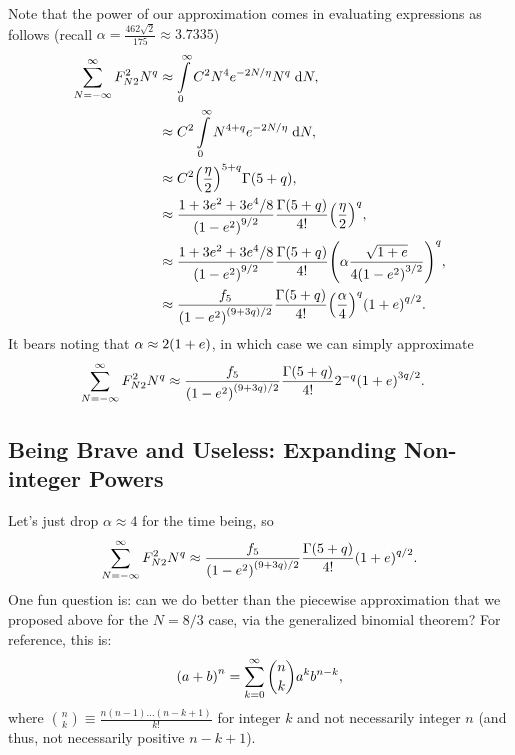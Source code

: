 \documentclass[11pt,
        usenames, %
        dvipsnames %
    ]{article}
\DeclarePairedDelimiter\p{\lparen}{\rparen}
\begin{document}
Note that the power of our approximation comes in evaluating expressions as
follows (recall $\alpha = \frac{462\sqrt{2}}{175} \approx 3.7335$)
\begin{align}
    \sum\limits_{N = -\infty}^\infty F_{N2}^2 N^q
        &\approx \int\limits_0^\infty C^2 N^4 e^{-2 N / \eta}N^q
            \;\mathrm{d}N,\\
        &\approx C^2 \int\limits_{0}^\infty N^{4 + q}
            e^{-2N / \eta}\;\mathrm{d}N,\\
        &\approx C^2 \p*{\frac{\eta}{2}}^{5 + q}\Gamma\p*{5 + q},\\
        &\approx \frac{1 + 3e^2 + 3e^4/8}{\p*{1 - e^2}^{9/2}}
            \frac{\Gamma\p*{5 + q}}{4!}\p*{\frac{\eta}{2}}^q,\\
        &\approx \frac{1 + 3e^2 + 3e^4/8}{\p*{1 - e^2}^{9/2}}
            \frac{\Gamma\p*{5 + q}}{4!}\p*{\alpha\frac{\sqrt{1 + e}}{
                4\p*{1 - e^2}^{3/2}}}^q,\\
        &\approx \frac{f_5}{\p*{1 - e^2}^{(9 + 3q) / 2}}
            \frac{\Gamma\p*{5 + q}}{4!}\p*{\frac{\alpha}{4}}^q
            \p*{1 + e}^{q/2}.
\end{align}
It bears noting that $\alpha \approx 2\p*{1 + e}$, in which case we can simply
approximate
\begin{align}
    \sum\limits_{N = -\infty}^\infty F_{N2}^2 N^q
        &\approx \frac{f_5}{\p*{1 - e^2}^{(9 + 3q) / 2}}
            \frac{\Gamma\p*{5 + q}}{4!}2^{-q}
            \p*{1 + e}^{3q/2}.
\end{align}

\subsection{Being Brave and Useless: Expanding Non-integer Powers}

Let's just drop $\alpha \approx 4$ for the time being, so
\begin{equation}
    \sum\limits_{N = -\infty}^\infty F_{N2}^2 N^q
        \approx \frac{f_5}{\p*{1 - e^2}^{(9 + 3q) / 2}}
            \frac{\Gamma\p*{5 + q}}{4!} \p*{1 + e}^{q/2}.
\end{equation}
One fun question is: can we do better than the piecewise approximation that we
proposed above for the $N = 8/3$ case, via the generalized binomial theorem? For
reference, this is:
\begin{equation}
    \p*{a + b}^n = \sum\limits_{k = 0}^\infty \binom{n}{k}a^kb^{n - k},
\end{equation}
where $\binom{n}{k} \equiv \frac{n(n - 1)\dots (n - k + 1)}{k!}$ for integer $k$
and not necessarily integer $n$ (and thus, not necessarily positive $n - k +
1$).
\end{document}
